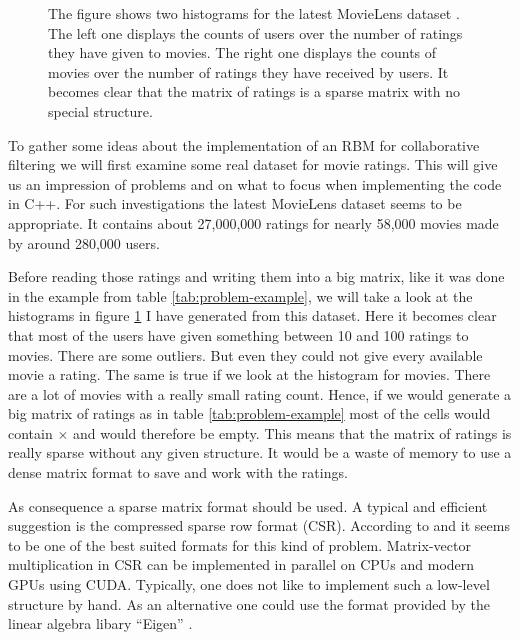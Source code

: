 \documentclass[crop=false,10pt]{standalone}
\begin{document}
\begin{figure}
\begin{subfigure}[b]{0.49\textwidth}
      \end{subfigure}
      \caption{%
        The figure shows two histograms for the latest MovieLens dataset \cite{MovieLensDataset}.
        The left one displays the counts of users over the number of ratings they have given to movies.
        The right one displays the counts of movies over the number of ratings they have received by users.
        It becomes clear that the matrix of ratings is a sparse matrix with no special structure.
      }
      \label{fig:rating-histograms}
    \end{figure}

    To gather some ideas about the implementation of an RBM for collaborative filtering we will first examine some real dataset for movie ratings.
    This will give us an impression of problems and on what to focus when implementing the code in C++.
    For such investigations the latest MovieLens dataset \cite{MovieLensDataset} seems to be appropriate.
    It contains about 27,000,000 ratings for nearly 58,000 movies made by around 280,000 users.

    Before reading those ratings and writing them into a big matrix, like it was done in the example from table \ref{tab:problem-example}, we will take a look at the histograms in figure \ref{fig:rating-histograms} I have generated from this dataset.
    Here it becomes clear that most of the users have given something between 10 and 100 ratings to movies.
    There are some outliers.
    But even they could not give every available movie a rating.
    The same is true if we look at the histogram for movies.
    There are a lot of movies with a really small rating count.
    Hence, if we would generate a big matrix of ratings as in table \ref{tab:problem-example} most of the cells would contain $\times$ and would therefore be empty.
    This means that the matrix of ratings is really sparse without any given structure.
    It would be a waste of memory to use a dense matrix format to save and work with the ratings.

    As consequence a sparse matrix format should be used.
    A typical and efficient suggestion is the compressed sparse row format (CSR).
    According to \cite{Bell2008} and \cite{Bell2009} it seems to be one of the best suited formats for this kind of problem.
    Matrix-vector multiplication in CSR can be implemented in parallel on CPUs and modern GPUs using CUDA.
    Typically, one does not like to implement such a low-level structure by hand.
    As an alternative one could use the format provided by the linear algebra libary \enquote{Eigen} \cite{eigen2018}.
    \cite{Bell2008,Bell2009}
\end{document}
